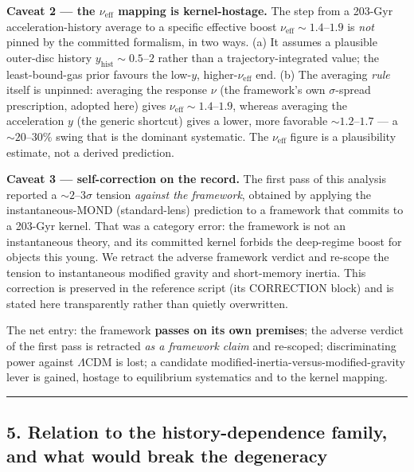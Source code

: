 \documentclass[
]{article}
\begin{document}
\textbf{Caveat 2 --- the \(\nu_\mathrm{eff}\) mapping is kernel-hostage.}
The step from a 203-Gyr acceleration-history average to a specific
effective boost \(\nu_\mathrm{eff}\sim1.4\)--\(1.9\) is \emph{not} pinned
by the committed formalism, in two ways. (a) It assumes a plausible
outer-disc history \(y_\mathrm{hist}\sim 0.5\)--\(2\) rather than a
trajectory-integrated value; the least-bound-gas prior favours the
low-\(y\), higher-\(\nu_\mathrm{eff}\) end. (b) The averaging \emph{rule}
itself is unpinned: averaging the response \(\nu\) (the framework's own
\(\sigma\)-spread prescription, adopted here) gives
\(\nu_\mathrm{eff}\sim1.4\)--\(1.9\), whereas averaging the acceleration
\(y\) (the generic shortcut) gives a lower, more favorable
\(\sim1.2\)--\(1.7\) --- a \(\sim\!20\)--\(30\%\) swing that is the
dominant systematic. The \(\nu_\mathrm{eff}\) figure is a plausibility
estimate, not a derived prediction.

\textbf{Caveat 3 --- self-correction on the record.} The first pass of
this analysis reported a \(\sim\!2\)--\(3\sigma\) tension \emph{against
the framework}, obtained by applying the instantaneous-MOND
(standard-lens) prediction to a framework that commits to a 203-Gyr
kernel. That was a category error: the framework is not an instantaneous
theory, and its committed kernel forbids the deep-regime boost for
objects this young. We retract the adverse framework verdict and
re-scope the tension to instantaneous modified gravity and short-memory
inertia. This correction is preserved in the reference script (its
CORRECTION block) and is stated here transparently rather than quietly
overwritten.

The net entry: the framework \textbf{passes on its own premises}; the
adverse verdict of the first pass is retracted \emph{as a framework
claim} and re-scoped; discriminating power against \(\Lambda\)CDM is
lost; a candidate modified-inertia-versus-modified-gravity lever is
gained, hostage to equilibrium systematics and to the kernel mapping.

\begin{center}\rule{0.5\linewidth}{0.5pt}\end{center}

\subsection{5. Relation to the history-dependence family, and what would
break the
degeneracy}\label{relation-to-the-history-dependence-family-and-what-would-break-the-degeneracy}
\end{document}
